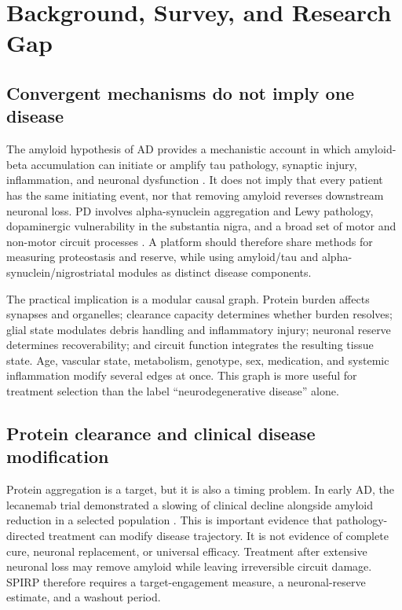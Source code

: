 \documentclass[conference]{IEEEtran}
\begin{document}
\section{Background, Survey, and Research Gap}
\subsection{Convergent mechanisms do not imply one disease}
The amyloid hypothesis of AD provides a mechanistic account in which amyloid-beta accumulation can initiate or amplify tau pathology, synaptic injury, inflammation, and neuronal dysfunction \cite{selkoe2016}. It does not imply that every patient has the same initiating event, nor that removing amyloid reverses downstream neuronal loss. PD involves alpha-synuclein aggregation and Lewy pathology, dopaminergic vulnerability in the substantia nigra, and a broad set of motor and non-motor circuit processes \cite{poewe2017,bloem2021}. A platform should therefore share methods for measuring proteostasis and reserve, while using amyloid/tau and alpha-synuclein/nigrostriatal modules as distinct disease components.

The practical implication is a modular causal graph. Protein burden affects synapses and organelles; clearance capacity determines whether burden resolves; glial state modulates debris handling and inflammatory injury; neuronal reserve determines recoverability; and circuit function integrates the resulting tissue state. Age, vascular state, metabolism, genotype, sex, medication, and systemic inflammation modify several edges at once. This graph is more useful for treatment selection than the label ``neurodegenerative disease'' alone.

\subsection{Protein clearance and clinical disease modification}
Protein aggregation is a target, but it is also a timing problem. In early AD, the lecanemab trial demonstrated a slowing of clinical decline alongside amyloid reduction in a selected population \cite{vandyk2023}. This is important evidence that pathology-directed treatment can modify disease trajectory. It is not evidence of complete cure, neuronal replacement, or universal efficacy. Treatment after extensive neuronal loss may remove amyloid while leaving irreversible circuit damage. SPIRP therefore requires a target-engagement measure, a neuronal-reserve estimate, and a washout period.
\end{document}
